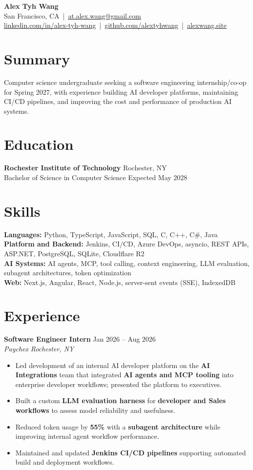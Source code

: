 \documentclass[10pt,letterpaper]{article}
\newif\ifresumeFirstRole
\newcommand{\resumeRole}[4]{%
  \ifresumeFirstRole
    \global\resumeFirstRolefalse
  \else
    \vspace{0pt plus 1fill}%
  \fi
  \textbf{#1} \hfill #2\\
  \textit{#3} \hfill \textit{#4}
}
\begin{document}
\begin{center}
{\Large \textbf{Alex Tyh Wang}}\\
San Francisco, CA \,|\, \href{mailto:at.alex.wang@gmail.com}{at.alex.wang@gmail.com}\\
\small \href{https://www.linkedin.com/in/alex-tyh-wang/}{linkedin.com/in/alex-tyh-wang} \,|\, \href{https://github.com/alextyhwang}{github.com/alextyhwang} \,|\, \href{https://alexwang.site}{alexwang.site}
\end{center}

\section*{Summary}
Computer science undergraduate seeking a software engineering internship/co-op for Spring 2027, with experience building AI developer platforms, maintaining CI/CD pipelines, and improving the cost and performance of production AI systems.

\section*{Education}
\textbf{Rochester Institute of Technology} \hfill Rochester, NY\\
Bachelor of Science in Computer Science \hfill Expected May 2028

\section*{Skills}
\textbf{Languages:} Python, TypeScript, JavaScript, SQL, C, C++, C\#, Java\\
\textbf{Platform and Backend:} Jenkins, CI/CD, Azure DevOps, asyncio, REST APIs, ASP.NET, PostgreSQL, SQLite, Cloudflare R2\\
\textbf{AI Systems:} AI agents, MCP, tool calling, context engineering, LLM evaluation, subagent architectures, token optimization\\
\textbf{Web:} Next.js, Angular, React, Node.js, server-sent events (SSE), IndexedDB

\section*{Experience}
\resumeRole{Software Engineer Intern}{Jan 2026 -- Aug 2026}{Paychex}{Rochester, NY}
\begin{itemize}
  \item Led development of an internal AI developer platform on the \textbf{AI Integrations} team that integrated \textbf{AI agents and MCP tooling} into enterprise developer workflows; presented the platform to executives.
  \item Built a custom \textbf{LLM evaluation harness} for \textbf{developer and Sales workflows} to assess model reliability and usefulness.
  \item Reduced token usage by \textbf{55\%} with a \textbf{subagent architecture} while improving internal agent workflow performance.
  \item Maintained and updated \textbf{Jenkins CI/CD pipelines} supporting automated build and deployment workflows.
\end{itemize}
\end{document}
